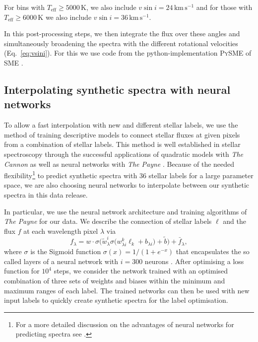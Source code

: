 \documentclass[
  journal=pasa,
  manuscript=research-paper, %
  year=2021,
  volume=37
]{cup-journal}
\newcommand{\Teff}{$T_\mathrm{eff}$\xspace}
\newcommand{\kms}{\,\mathrm{km\,s^{-1}}}	%
\begin{document}
For bins with \Teff$\geq 5000\,\mathrm{K}$, we also include $v \sin i = 24 \kms$ and for those with \Teff$\geq 6000\,\mathrm{K}$ we also include $v \sin i = 36 \kms$. 

In this post-processing steps, we then integrate the flux over these angles and simultaneously broadening the spectra with the different rotational velocities (Eq.~\ref{eq:vsini}). For this we use code from the python-implementation \textsc{PySME} \citep{Wehrhahn2021} of \textsc{SME} \citep{Piskunov2017}.

\subsection{Interpolating synthetic spectra with neural networks} \label{sec:interpolating_synthetic_spectra_with_neural_networks}

To allow a fast interpolation with new and different stellar labels, we use the method of training descriptive models to connect stellar fluxes at given pixels from a combination of stellar labels. This method is well established in stellar spectroscopy through the successful applications of quadratic models with \textit{The Cannon} \citep[see e.g.][]{Ness2015, Ness2016, Casey2016, Casey2017, Ho2017, Buder2018} as well as neural networks with \textit{The Payne} \citep[see e.g.][]{Ting2019, Xiang2019, Xiang2021}. Because of the needed flexibility\footnote{For a more detailed discussion on the advantages of neural networks for predicting spectra see \citet{Ting2019}.} to predict synthetic spectra with 36 stellar labels for a large parameter space, we are also choosing neural networks to interpolate between our synthetic spectra in this data release.

In particular, we use the neural network architecture and training algorithms of \textit{The Payne} \citep{Ting2019} for our data. We describe the connection of stellar labels $\boldsymbol{\ell}$ and the flux $f$ at each wavelength pixel $\lambda$ via
\begin{equation}
f_\lambda = w \cdot \sigma\bigg( \tilde{w}_\lambda^i \sigma \Big( w^k_{\lambda i} \ell_k + b_{\lambda i} \Big) + \tilde{b} \bigg) + \bar{f}_\lambda,
\label{eq:neural_network_function}
\end{equation}
where $\sigma$ is the Sigmoid function $\sigma (x) = 1/(1 + e^{-x})$ that encapsulates the so called layers of a neural network with $i = 300$ neurons \citep[see ][for more details]{Ting2019}. After optimising a loss function for $10^4$ steps, we consider the network trained with an optimised combination of three sets of weights and biases within the minimum and maximum ranges of each label. The trained networks can then be used with new input labels to quickly create synthetic spectra for the label optimisation.
\end{document}
